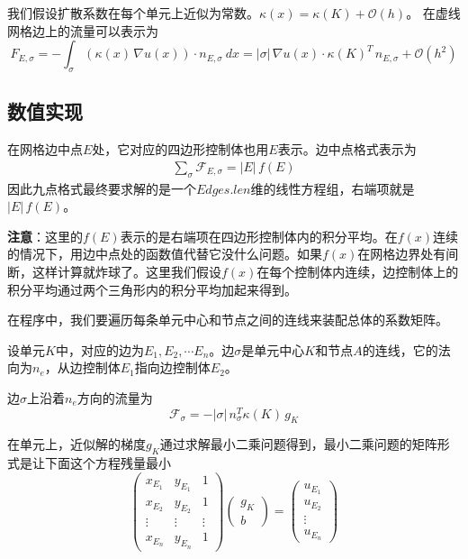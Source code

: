 \documentclass[12pt,a4paper]{article}
\theoremstyle{plain}
\begin{document}
我们假设扩散系数在每个单元上近似为常数。$\kappa(x) = \kappa(K) + \mathcal{O}(h)$。
在虚线网格边上的流量可以表示为
\begin{equation*}
F_{E, \sigma} = - \int_{\sigma} (\kappa(x) \, \nabla u(x)) \cdot n_{E, \sigma} \ dx = |\sigma| \,  \nabla u(x) \cdot \kappa(K)^T \, n_{E, \sigma} + \mathcal{O}(h^2)
\end{equation*}

\subsection*{数值实现}

在网格边中点$E$处，它对应的四边形控制体也用$E$表示。边中点格式表示为
\begin{align*}
\sum_{\sigma} \mathcal{F}_{E, \sigma} = |E| \, f(E)
\end{align*}
因此九点格式最终要求解的是一个$Edges.len$维的线性方程组，右端项就是$|E| \, f(E)$。

\textbf{注意}：这里的$f(E)$表示的是右端项在四边形控制体内的积分平均。在$f(x)$连续的情况下，用边中点处的函数值代替它没什么问题。如果$f(x)$在网格边界处有间断，这样计算就炸球了。这里我们假设$f(x)$在每个控制体内连续，边控制体上的积分平均通过两个三角形内的积分平均加起来得到。

在程序中，我们要遍历每条单元中心和节点之间的连线来装配总体的系数矩阵。

设单元$K$中，对应的边为$E_1, E_2, \cdots E_n$。边$\sigma$是单元中心$K$和节点$A$的连线，它的法向为$n_e$，从边控制体$E_1$指向边控制体$E_2$。

边$\sigma$上沿着$n_e$方向的流量为
\begin{equation*}
\mathcal{F}_{\sigma} = -|\sigma| \, n_{\sigma}^T \kappa(K) \, g_K
\end{equation*}

在单元上，近似解的梯度$g_K$通过求解最小二乘问题得到，最小二乘问题的矩阵形式是让下面这个方程残量最小
\begin{equation*}
\left(
\begin{matrix}
x_{E_1} & y_{E_1} & 1 \\
x_{E_2} & y_{E_2} & 1 \\
\vdots & \vdots & \vdots \\
x_{E_n} & y_{E_n} & 1
\end{matrix}
\right)
\left(
\begin{matrix}
g_K \\
b
\end{matrix}
\right)
=
\left(
\begin{matrix}
u_{E_1} \\
u_{E_2} \\
\vdots \\
u_{E_n}
\end{matrix}
\right)
\end{equation*}
\end{document}
